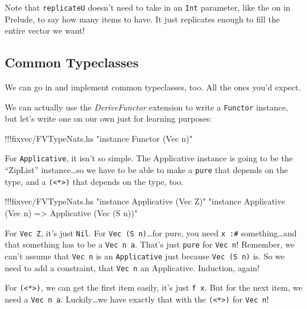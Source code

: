 \documentclass[]{article}
\newenvironment{Shaded}{}{}
\newcommand{\StringTok}[1]{\textcolor[rgb]{0.25,0.44,0.63}{{#1}}}
\newcommand{\FunctionTok}[1]{\textcolor[rgb]{0.02,0.16,0.49}{{#1}}}
\newcommand{\NormalTok}[1]{{#1}}
\begin{document}
Note that \texttt{replicateU} doesn't need to take in an \texttt{Int}
parameter, like the on in Prelude, to say how many items to have. It
just replicates enough to fill the entire vector we want!

\subsection{Common Typeclasses}\label{common-typeclasses}

We can go in and implement common typeclasses, too. All the ones you'd
expect.

We can actually use the \emph{DeriveFunctor} extension to write a
\texttt{Functor} instance, but let's write one on our own just for
learning purposes:

\begin{Shaded}
\begin{Highlighting}[]
\FunctionTok{!!!}\NormalTok{fixvec}\FunctionTok{/}\NormalTok{FVTypeNats.hs }\StringTok{"instance Functor (Vec n)"}
\end{Highlighting}
\end{Shaded}

For \texttt{Applicative}, it isn't so simple. The Applicative instance
is going to be the ``ZipList'' instance\ldots{}so we have to be able to
make a \texttt{pure} that depends on the type, and a
\texttt{(\textless{}*\textgreater{})} that depends on the type, too.

\begin{Shaded}
\begin{Highlighting}[]
\FunctionTok{!!!}\NormalTok{fixvec}\FunctionTok{/}\NormalTok{FVTypeNats.hs }\StringTok{"instance Applicative (Vec Z)"} \StringTok{"instance Applicative (Vec n) => Applicative (Vec (S n))"}
\end{Highlighting}
\end{Shaded}

For \texttt{Vec\ Z}, it's just \texttt{Nil}. For
\texttt{Vec\ (S\ n)}\ldots{}for pure, you need \texttt{x\ :\#}
something\ldots{}and that something has to be a \texttt{Vec\ n\ a}.
That's just \texttt{pure} for \texttt{Vec\ n}! Remember, we can't assume
that \texttt{Vec\ n} is an \texttt{Applicative} just because
\texttt{Vec\ (S\ n)} is. So we need to add a constraint, that
\texttt{Vec\ n} an Applicative. Induction, again!

For \texttt{(\textless{}*\textgreater{})}, we can get the first item
easily, it's just \texttt{f\ x}. But for the next item, we need a
\texttt{Vec\ n\ a}. Luckily\ldots{}we have exactly that with the
\texttt{(\textless{}*\textgreater{})} for \texttt{Vec\ n}!
\end{document}
